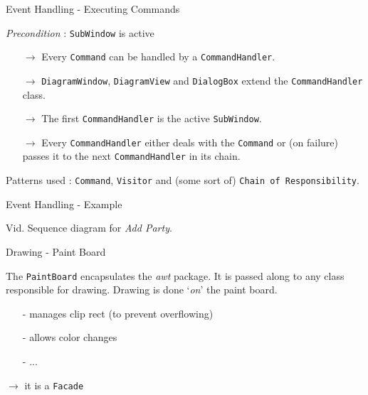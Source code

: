 \documentclass[10pt]{beamer}
\begin{document}
\begin{frame}[fragile]{Event Handling - Executing Commands}
	\begin{center}
	\textit{Precondition} : \texttt{SubWindow} is active
	\begin{itemize}
	\item[$\rightarrow$] Every \texttt{Command} can be handled by a \texttt{CommandHandler}.
	\item[$\rightarrow$] \texttt{DiagramWindow}, \texttt{DiagramView} and \texttt{DialogBox} extend the \texttt{CommandHandler} class. 
	\item[$\rightarrow$] The first \texttt{CommandHandler} is the active \texttt{SubWindow}.
	\item[$\rightarrow$] Every \texttt{CommandHandler} either deals with the \texttt{Command} or (on failure) passes it to the next \texttt{CommandHandler} in its chain. 
	\end{itemize}
	Patterns used : \texttt{Command}, \texttt{Visitor} and (some sort of) \texttt{Chain of Responsibility}.
	\end{center}
\end{frame}

\begin{frame}[fragile]{Event Handling - Example}
	\begin{center}
	Vid. Sequence diagram for \textit{Add Party}.
	\end{center}
\end{frame}

\begin{frame}[fragile]{Drawing - Paint Board}
	\begin{center}
	The \texttt{PaintBoard} encapsulates the \textit{awt} package. It is passed along to any class responsible for drawing. Drawing is done `\textit{on}' the paint board.
	\begin{itemize}
	\item[-] manages clip rect (to prevent overflowing)
	\item[-] allows color changes
	\item[-] ...
	\end{itemize}
	$\rightarrow$ it is a \texttt{Facade}
	\end{center}
\end{frame}
\end{document}
